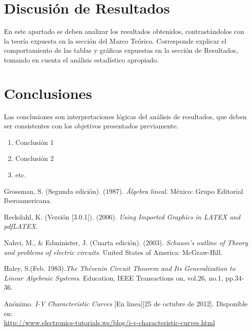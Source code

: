 \documentclass[osajnl,twocolumn,showpacs,superscriptaddress,10pt]{revtex4-1}
\begin{document}
\section{Discusión de Resultados}

En este apartado se deben analizar los resultados obtenidos, contrastándolos con
la teoría expuesta en la sección del Marco Teórico. Corresponde explicar el
comportamiento de las tablas y gráficas expuestas en la sección de Resultados,
tomando en cuenta el análisis estadístico apropiado.\\

\section{Conclusiones}

Las conclusiones son interpretaciones lógicas del análisis de resultados, que
deben ser consistentes con los objetivos presentados previamente.\\

\begin{enumerate}
\item Conclusión 1
\item Conclusión 2
\item etc.
\end{enumerate}

\begin{thebibliography}{99}

\bibitem{} Grossman, S. (Segunda edición). (1987). \textit{Álgebra lineal}. México: Grupo Editorial Iberoamericana.

\bibitem{} Reckdahl, K. (Versión [3.0.1]). (2006).\textit{ Using Imported Graphics in LATEX and pdfLATEX}.

\bibitem{}Nahvi, M., \& Edminister, J. (Cuarta edición). (2003). \textit{Schaum's outline of Theory and problems of electric circuits}. United States of America: McGraw-Hill.

\bibitem{} Haley, S.(Feb. 1983).\textit{The Thévenin Circuit Theorem and Its Generalization to Linear Algebraic Systems}. Education, IEEE Transactions on, vol.26, no.1, pp.34-36.

\bibitem{}Anónimo.\textit{ I-V Characteristic Curves} [En linea][25 de octubre de 2012]. Disponible en:\\ \url{http://www.electronics-tutorials.ws/blog/i-v-characteristic-curves.html}
\end{thebibliography}
\end{document}
